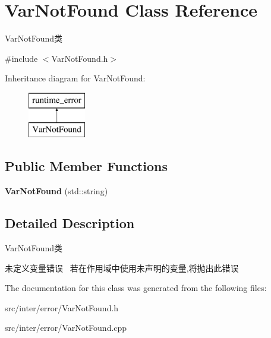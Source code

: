 \hypertarget{class_var_not_found}{}\section{Var\+Not\+Found Class Reference}
\label{class_var_not_found}


Var\+Not\+Found类  




{\ttfamily \#include $<$Var\+Not\+Found.\+h$>$}

Inheritance diagram for Var\+Not\+Found\+:\begin{figure}[H]
\begin{center}
\leavevmode
\includegraphics[height=2.000000cm]{class_var_not_found}
\end{center}
\end{figure}
\subsection*{Public Member Functions}
\begin{DoxyCompactItemize}
\item 
\mbox{\label{class_var_not_found_a36600e0d18a90f6a594cb582940b5bbc}} 
{\bfseries Var\+Not\+Found} (std\+::string)
\end{DoxyCompactItemize}


\subsection{Detailed Description}
Var\+Not\+Found类 

未定义变量错误~\newline
若在作用域中使用未声明的变量,将抛出此错误 

The documentation for this class was generated from the following files\+:\begin{DoxyCompactItemize}
\item 
src/inter/error/Var\+Not\+Found.\+h\item 
src/inter/error/Var\+Not\+Found.\+cpp\end{DoxyCompactItemize}
